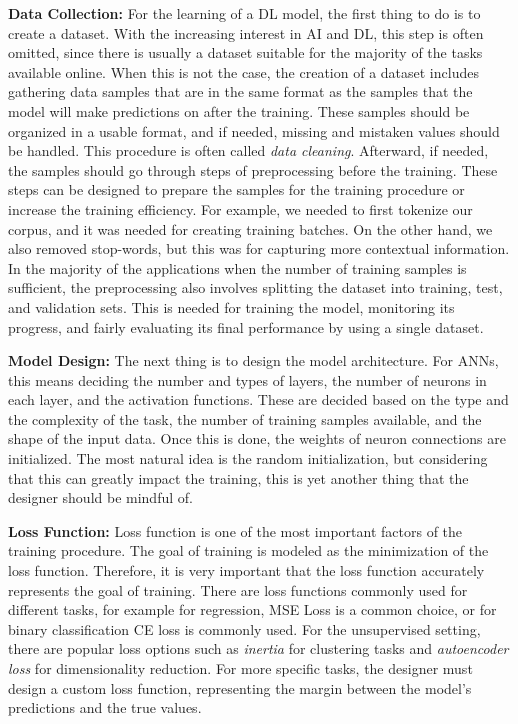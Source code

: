 \textbf{Data Collection:} For the learning of a \ac{DL} model, the first thing to do is to create a dataset. With the increasing interest in \ac{AI} and \ac{DL}, this step is often omitted, since there is usually a dataset suitable for the majority of the tasks available online. When this is not the case, the creation of a dataset includes gathering data samples that are in the same format as the samples that the model will make predictions on after the training. These samples should be organized in a usable format, and if needed, missing and mistaken values should be handled. This procedure is often called \textit{data cleaning}. Afterward, if needed, the samples should go through steps of preprocessing before the training. These steps can be designed to prepare the samples for the training procedure or increase the training efficiency. For example, we needed to first tokenize our corpus, and it was needed for creating training batches. On the other hand, we also removed stop-words, but this was for capturing more contextual information. In the majority of the applications when the number of training samples is sufficient, the preprocessing also involves splitting the dataset into training, test, and validation sets. This is needed for training the model, monitoring its progress, and fairly evaluating its final performance by using a single dataset.

\textbf{Model Design:} The next thing is to design the model architecture. For \ac{ANN}s, this means deciding the number and types of layers, the number of neurons in each layer, and the activation functions. These are decided based on the type and the complexity of the task, the number of training samples available, and the shape of the input data. Once this is done, the weights of neuron connections are initialized. The most natural idea is the random initialization, but considering that this can greatly impact the training, this is yet another thing that the designer should be mindful of.

\textbf{Loss Function:} Loss function is one of the most important factors of the training procedure. The goal of training is modeled as the minimization of the loss function. Therefore, it is very important that the loss function accurately represents the goal of training. There are loss functions commonly used for different tasks, for example for regression, \ac{MSE} Loss is a common choice, or for binary classification \ac{CE} loss is commonly used. For the unsupervised setting, there are popular loss options such as \textit{inertia} for clustering tasks and \textit{autoencoder loss} for dimensionality reduction. For more specific tasks, the designer must design a custom loss function, representing the margin between the model's predictions and the true values.

